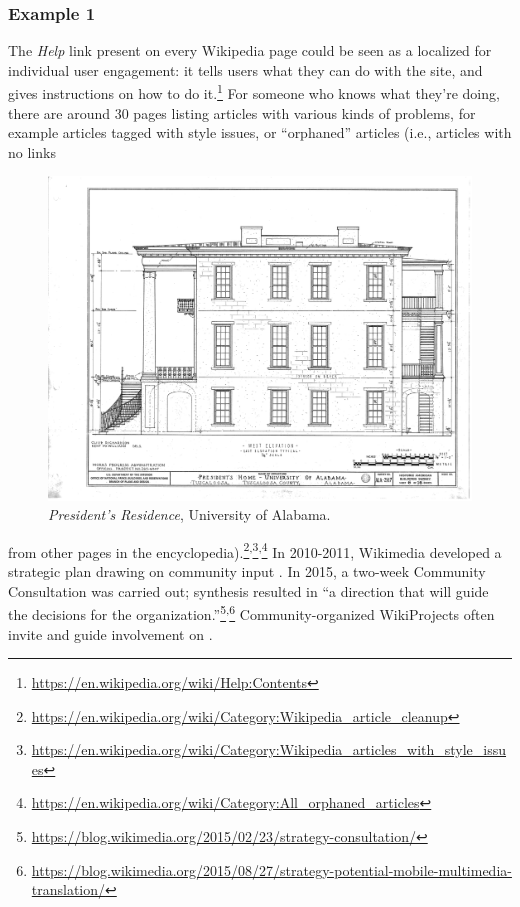 \subsubsection*{Example 1}  The \emph{Help} link present on every Wikipedia page could be seen as a
localized  for individual user
engagement: it tells users what they can do with the site, and gives instructions on how to do it.\footnote{\url{https://en.wikipedia.org/wiki/Help:Contents}}
For someone who knows what they're doing, there are
around 30 pages listing articles with various kinds of problems, for
example articles tagged with style issues, or ``orphaned'' articles
(i.e., articles with no links
\begin{figure}
\vspace{-.3cm}
{\centering
\includegraphics[width=.34\textwidth,trim=140 30 30 30, clip=true]{alabama-gray}

\par}
\vspace{-.3cm}
\captionsetup{font=footnotesize,width=.3\textwidth}
\caption{\textsl{President's Residence}, University of Alabama.
\label{presidents-home}}
\vspace{-.8cm}
\end{figure}
 from other pages in the
encyclopedia).\footnote{\url{https://en.wikipedia.org/wiki/Category:Wikipedia_article_cleanup}}\textsuperscript{,}\footnote{\url{https://en.wikipedia.org/wiki/Category:Wikipedia_articles_with_style_issues}}\textsuperscript{,}\footnote{\url{https://en.wikipedia.org/wiki/Category:All_orphaned_articles}}
%
%
In 2010-2011, Wikimedia
 developed
a strategic plan drawing 
on community input \cite{wikimedia2011plan}.
  In 2015, a two-week 
Community Consultation was carried out; synthesis resulted in ``a direction that will guide the decisions for the organization.''\footnote{\url{https://blog.wikimedia.org/2015/02/23/strategy-consultation/}}\textsuperscript{,}\footnote{\url{https://blog.wikimedia.org/2015/08/27/strategy-potential-mobile-multimedia-translation/}}
%
%
 Community-organized WikiProjects often invite and guide involvement
 on .



